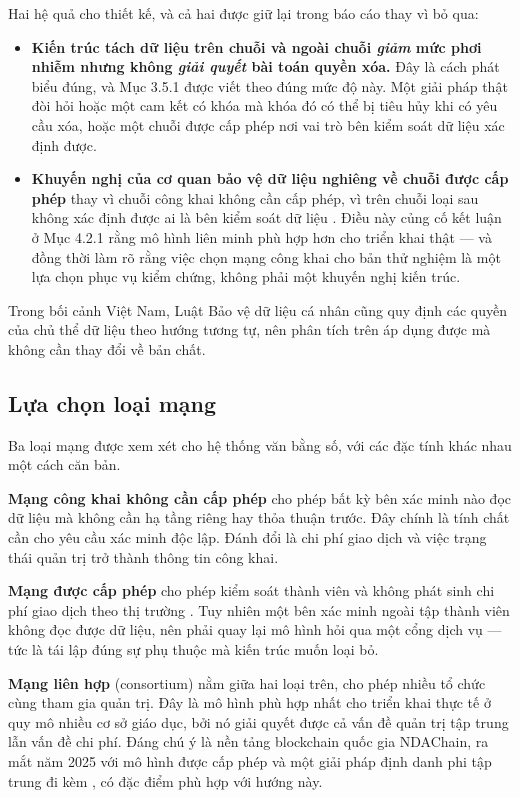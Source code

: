 Hai hệ quả cho thiết kế, và cả hai được giữ lại trong báo cáo thay vì bỏ qua:

\begin{itemize}
    \item \textbf{Kiến trúc tách dữ liệu trên chuỗi và ngoài chuỗi \emph{giảm} mức phơi nhiễm nhưng không \emph{giải quyết} bài toán quyền xóa.} Đây là cách phát biểu đúng, và Mục 3.5.1 được viết theo đúng mức độ này. Một giải pháp thật đòi hỏi hoặc một cam kết có khóa mà khóa đó có thể bị tiêu hủy khi có yêu cầu xóa, hoặc một chuỗi được cấp phép nơi vai trò bên kiểm soát dữ liệu xác định được.
    \item \textbf{Khuyến nghị của cơ quan bảo vệ dữ liệu nghiêng về chuỗi được cấp phép} thay vì chuỗi công khai không cần cấp phép, vì trên chuỗi loại sau không xác định được ai là bên kiểm soát dữ liệu \cite{EDPB2025}. Điều này củng cố kết luận ở Mục 4.2.1 rằng mô hình liên minh phù hợp hơn cho triển khai thật --- và đồng thời làm rõ rằng việc chọn mạng công khai cho bản thử nghiệm là một lựa chọn phục vụ kiểm chứng, không phải một khuyến nghị kiến trúc.
\end{itemize}

Trong bối cảnh Việt Nam, Luật Bảo vệ dữ liệu cá nhân \cite{LuatBVDLCN2025} cũng quy định các quyền của chủ thể dữ liệu theo hướng tương tự, nên phân tích trên áp dụng được mà không cần thay đổi về bản chất.

\subsection{Lựa chọn loại mạng}

Ba loại mạng được xem xét cho hệ thống văn bằng số, với các đặc tính khác nhau một cách căn bản.

\textbf{Mạng công khai không cần cấp phép} cho phép bất kỳ bên xác minh nào đọc dữ liệu mà không cần hạ tầng riêng hay thỏa thuận trước. Đây chính là tính chất cần cho yêu cầu xác minh độc lập. Đánh đổi là chi phí giao dịch và việc trạng thái quản trị trở thành thông tin công khai.

\textbf{Mạng được cấp phép} cho phép kiểm soát thành viên và không phát sinh chi phí giao dịch theo thị trường \cite{Androulaki2018}. Tuy nhiên một bên xác minh ngoài tập thành viên không đọc được dữ liệu, nên phải quay lại mô hình hỏi qua một cổng dịch vụ --- tức là tái lập đúng sự phụ thuộc mà kiến trúc muốn loại bỏ.

\textbf{Mạng liên hợp} (consortium) nằm giữa hai loại trên, cho phép nhiều tổ chức cùng tham gia quản trị. Đây là mô hình phù hợp nhất cho triển khai thực tế ở quy mô nhiều cơ sở giáo dục, bởi nó giải quyết được cả vấn đề quản trị tập trung lẫn vấn đề chi phí. Đáng chú ý là nền tảng blockchain quốc gia NDAChain, ra mắt năm 2025 với mô hình được cấp phép và một giải pháp định danh phi tập trung đi kèm \cite{NDAChain2025}, có đặc điểm phù hợp với hướng này.

